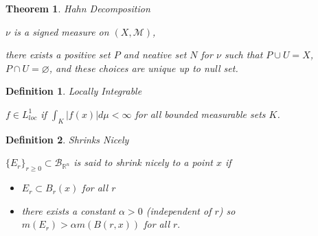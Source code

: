 \documentclass[12pt]{Qual}
\newtheorem{theorem}{Theorem}
\newtheorem{definition}{Definition}
\begin{document}
\vspace{0.5cm}
\begin{theorem}{\Large\textit{Hahn Decomposition}}

 $\nu$ is a signed measure on $(X,\mathscr{M})$,

\hspace{0.1cm}\begin{minipage}{0.85\textwidth}
\vspace{0.45cm}
there exists a positive set $P$ and neative set $N$ for $\nu$ such that $P\cup U=X$, $P\cap U=\varnothing$, and these choices are unique up to null set.
\end{minipage}



\end{theorem}
\vspace{0.5cm}
\begin{definition}{\Large\textit{Locally Integrable}}
$\,$

$f\in L_{loc}^1$ if $\int_K|f(x)|d\mu<\infty$ for all bounded measurable sets $K$.

\end{definition}
\vspace{0.5cm}
\begin{definition}{\Large\textit{Shrinks Nicely}}
$\,$

$\{E_r\}_{r\ge0}\subset\mathscr{B}_{\mathbb{R}^n}$ is said to shrink nicely to a point $x$ if \begin{itemize}
\setlength\itemsep{-0.1em}
\renewcommand\labelitemi{\faCoffee}
    \item $E_r\subset B_r(x)$ for all $r$
    \item there exists a constant $\alpha>0$ (independent of $r$) so $m(E_r)>\alpha m(B(r,x))$ for all $r.$
\end{itemize}


\end{definition}
\vspace{0.5cm}
\end{document}
